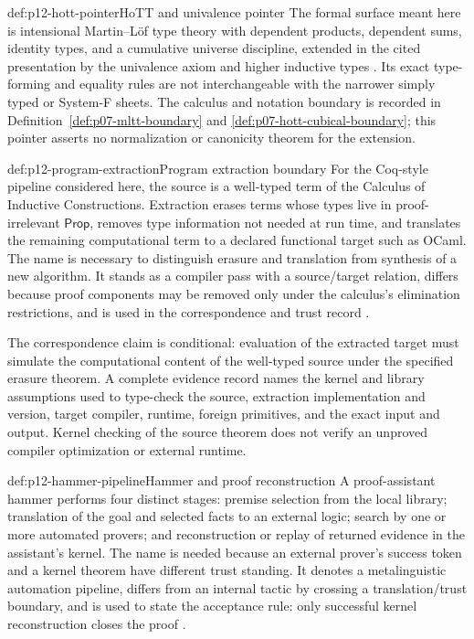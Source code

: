 \begin{proofboundary}{def:p12-hott-pointer}{HoTT and univalence pointer}
The formal surface meant here is intensional Martin--L\"of type theory with
dependent products, dependent sums, identity types, and a cumulative universe
discipline, extended in the cited presentation by the univalence axiom and
higher inductive types \cite{HoTTBook2013}. Its exact type-forming and equality
rules are not interchangeable with the narrower simply typed or System-F
sheets. The calculus and notation boundary is recorded in
Definition~\ref{def:p07-mltt-boundary} and
\ref{def:p07-hott-cubical-boundary}; this pointer asserts no normalization or
canonicity theorem for the extension.
\end{proofboundary}

\begin{hbdefinition}{def:p12-program-extraction}{Program extraction boundary}
For the Coq-style pipeline considered here, the source is a well-typed term of
the Calculus of Inductive Constructions. Extraction erases terms whose types
live in proof-irrelevant \(\mathsf{Prop}\), removes type information not needed
at run time, and translates the remaining computational term to a declared
functional target such as OCaml. The name is necessary to distinguish erasure
and translation from synthesis of a new algorithm. It stands as a compiler
pass with a source/target relation, differs because proof components may be
removed only under the calculus's elimination restrictions, and is used in the
correspondence and trust record \cite{Letouzey2008}.
\end{hbdefinition}

The correspondence claim is conditional: evaluation of the extracted target
must simulate the computational content of the well-typed source under the
specified erasure theorem. A complete evidence record names the kernel and
library assumptions used to type-check the source, extraction implementation
and version, target compiler, runtime, foreign primitives, and the exact input
and output. Kernel checking of the source theorem does not verify an unproved
compiler optimization or external runtime.

\begin{hbdefinition}{def:p12-hammer-pipeline}{Hammer and proof reconstruction}
A proof-assistant hammer performs four distinct stages: premise selection from
the local library; translation of the goal and selected facts to an external
logic; search by one or more automated provers; and reconstruction or replay
of returned evidence in the assistant's kernel. The name is needed because an
external prover's success token and a kernel theorem have different trust
standing. It denotes a metalinguistic automation pipeline, differs from an
internal tactic by crossing a translation/trust boundary, and is used to state
the acceptance rule: only successful kernel reconstruction closes the proof
\cite{BlanchetteEtAl2016Hammering}.
\end{hbdefinition}

